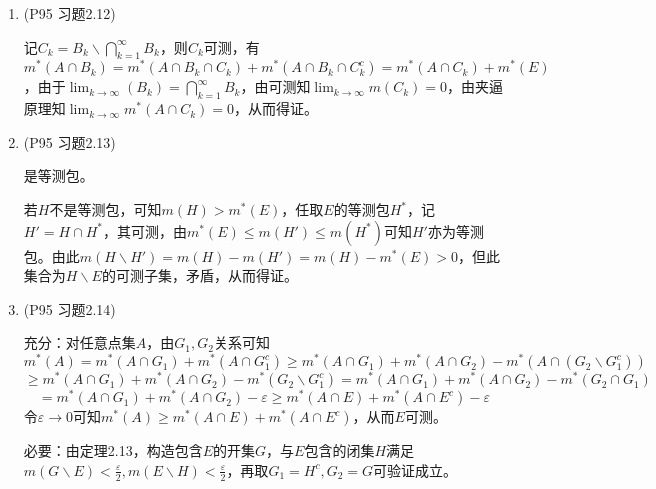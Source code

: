 \documentclass[a4paper,UTF8,fontset=windows]{ctexart}
\begin{document}
\begin{enumerate}
    \item (P95 习题2.12)
    
    记$C_k=B_k\backslash\bigcap_{k=1}^\infty B_k$，则$C_k$可测，有$m^*(A\cap B_k)=m^*(A\cap B_k\cap C_k)+m^*(A\cap B_k\cap C_k^c)=m^*(A\cap C_k)+m^*(E)$，由于$\lim_{k\to\infty}(B_k)=\bigcap_{k=1}^\infty B_k$，由可测知$\lim_{k\to\infty}m(C_k)=0$，由夹逼原理知$\lim_{k\to\infty}m^*(A\cap C_k)=0$，从而得证。
    
    \item (P95 习题2.13)
    
    是等测包。
    
    若$H$不是等测包，可知$m(H)>m^*(E)$，任取$E$的等测包$H^*$，记$H'=H\cap H^*$，其可测，由$m^*(E)\le m(H')\le m(H^*)$可知$H'$亦为等测包。由此$m(H\backslash H')=m(H)-m(H')=m(H)-m^*(E)>0$，但此集合为$H\backslash E$的可测子集，矛盾，从而得证。
    
    \item (P95 习题2.14)
    
    充分：对任意点集$A$，由$G_1,G_2$关系可知
    \[m^*(A)=m^*(A\cap G_1)+m^*(A\cap G_1^c)\ge m^*(A\cap G_1)+m^*(A\cap G_2)-m^*(A\cap(G_2\backslash G_1^c))\]
    \[\ge m^*(A\cap G_1)+m^*(A\cap G_2)-m^*(G_2\backslash G_1^c)=m^*(A\cap G_1)+m^*(A\cap G_2)-m^*(G_2\cap G_1)\]
    \[=m^*(A\cap G_1)+m^*(A\cap G_2)-\varepsilon\ge m^*(A\cap E)+m^*(A\cap E^c)-\varepsilon\]
    令$\varepsilon\to0$可知$m^*(A)\ge m^*(A\cap E)+m^*(A\cap E^c)$，从而$E$可测。
    
    必要：由定理2.13，构造包含$E$的开集$G$，与$E$包含的闭集$H$满足$m(G\backslash E)<\frac{\varepsilon}{2},m(E\backslash H)<\frac{\varepsilon}{2}$，再取$G_1=H^c,G_2=G$可验证成立。
\end{enumerate}
\end{document}
